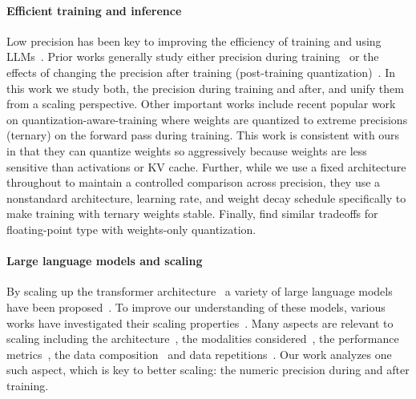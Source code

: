 \documentclass[11pt]{article}
\begin{document}
\paragraph{Efficient training and inference} Low precision has been key to improving the efficiency of training and using LLMs~\citep{micikevicius2017mixed,shoeybi2019megatron,wortsman2023stable,zhu2023survey}. Prior works generally study either precision during training~\citep{courbariaux2014training,dettmers2024qlora,dettmers20218,sun2020ultra,liu2023llm} or the effects of changing the precision after training (post-training quantization)~\citep{frantar2022gptq,lin2024awq,dettmers2022gpt3,xiao2023smoothquant,sheng2023flexgen,dettmers2023spqr}. In this work we study both, the precision during training and after, and unify them from a scaling perspective. Other important works include recent popular work on quantization-aware-training \citep{ma2024era} where weights are quantized to extreme precisions (ternary) on the forward pass during training. This work is consistent with ours in that they can quantize weights so aggressively because weights are less sensitive than activations or KV cache. Further, while we use a fixed architecture throughout to maintain a controlled comparison across precision, they use a nonstandard architecture, learning rate, and weight decay schedule specifically to make training with ternary weights stable. Finally, \citep{Keller2018} find similar tradeoffs for floating-point type with weights-only quantization. 

\paragraph{Large language models and scaling} By scaling up the transformer architecture~\citep{vaswani2017attention} a variety of large language models have been proposed~\citep{brown2020languagemodelsfewshotlearners,rae2021scaling,touvron2023llama,touvron2023llama2,dubey2024llama,le2023bloom,muennighoff2022crosslingual,muennighoff2024olmoe,groeneveld2024olmo,jiang2023mistral,zhang2022opt,allal2023santacoder,li2023starcoder,lozhkov2024starcoder,luukkonen2023fingpt,bai2023qwen,chowdhery2023palm,team2023gemini,ustun2024aya,deitke2024molmo}. To improve our understanding of these models, various works have investigated their scaling properties~\citep{ruan2024observational,allen2024physics,hagele2024scaling}. Many aspects are relevant to scaling including the architecture~\citep{tay2022scaling,krajewski2024scaling,tao2024scaling,clark2022unified,tay2022transcending,scao2022language,peng2024eagle}, the modalities considered~\citep{aghajanyan2023scaling,alabdulmohsin2022revisiting,cherti2023reproducible}, the performance metrics~\citep{wei2022emergent,srivastava2022beyond,isik2024scaling}, the data composition~\citep{li2024datacomp,liu2024regmix,albalak2024survey} and data repetitions~\citep{muennighoff2024scaling}. Our work analyzes one such aspect, which is key to better scaling: the numeric precision during and after training.
\end{document}
